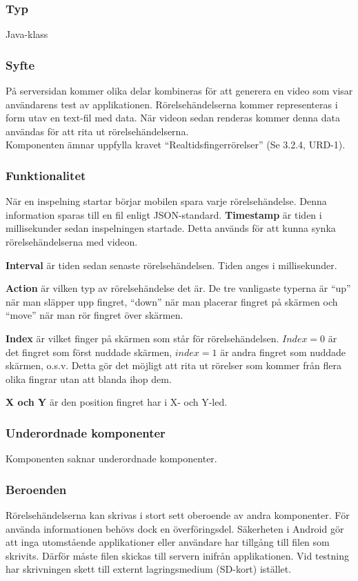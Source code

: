 \subsubsection{Typ}
Java-klass

\subsubsection{Syfte}
På serversidan kommer olika delar kombineras för att generera en video som visar användarens test av applikationen. Rörelsehändelserna kommer representeras i form utav en text-fil med data. När videon sedan renderas kommer denna data användas för att rita ut rörelsehändelserna. \\
Komponenten ämnar uppfylla kravet ``Realtidsfingerrörelser'' (Se 3.2.4, URD-1).

\subsubsection{Funktionalitet}
När en inspelning startar börjar mobilen spara varje rörelsehändelse. Denna information sparas till en fil enligt JSON-standard.
\textbf{Timestamp} är tiden i millisekunder sedan inspelningen startade. Detta används för att kunna synka rörelsehändelserna med videon.

\textbf{Interval} är tiden sedan senaste rörelsehändelsen. Tiden anges i millisekunder.
 
 \textbf{Action} är vilken typ av rörelsehändelse det är. De tre vanligaste typerna är ``up'' när man släpper upp fingret, ``down'' när man placerar fingret på skärmen och ``move'' när man rör fingret över skärmen.
 
 \textbf{Index} är vilket finger på skärmen som står för rörelsehändelsen. $Index=0$ är det fingret som först nuddade skärmen, $index=1$ är andra fingret som nuddade skärmen, o.s.v. Detta gör det möjligt att rita ut rörelser som kommer från flera olika fingrar utan att blanda ihop dem.
 
 \textbf{X och Y} är den position fingret har i X- och Y-led.
 
\subsubsection{Underordnade komponenter}
Komponenten saknar underordnade komponenter.

\subsubsection{Beroenden}
Rörelsehändelserna kan skrivas i stort sett oberoende av andra komponenter. För använda informationen behövs dock en överföringsdel. Säkerheten i Android gör att inga utomstående applikationer eller användare har tillgång till filen som skrivits. Därför måste filen skickas till servern inifrån applikationen. Vid testning har skrivningen skett till externt lagringsmedium (SD-kort) istället.

